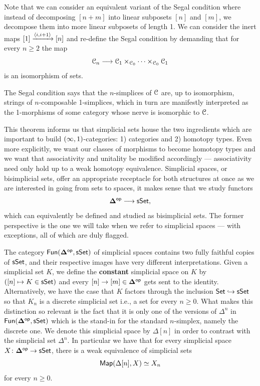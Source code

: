 \begin{remark}
 Note that we can consider an equivalent variant of the Segal condition where instead of decomposing $[n+m]$ into linear subposets $[n]$ and $[m]$, we decompose them into more linear subposets of length 1. We can consider the inert maps $[1] \xrightarrow{\langle i, i+1\rangle} [n]$ and re-define the Segal condition by demanding that for every $n\geq 2$ the map
 \begin{equation}
    \mathcal C_{n} \longrightarrow \mathcal C_{1} \times_{\mathcal C_{0}} \cdots \times_{\mathcal C_{0}} \mathcal C_{1}
 \end{equation}
 is an isomorphism of sets.
\end{remark}

\begin{observation}
The Segal condition says that the $n$-simplices of $\mathcal C$ are, up to isomorphism, strings of $n$-composable 1-simplices, which in turn are manifestly interpreted as the 1-morphisms of some category whose nerve is isomorphic to $\mathcal C$.
\end{observation}

This theorem informs us that simplicial sets house the two ingredients which are important to build $(\operatorname{\infty},1)$-categories: 1) categories and 2) homotopy types. Even more explicitly, we want our classes of morphisms to become homotopy types and we want that associativity and unitality be modified accordingly — associativity need only hold up to a weak homotopy equivalence. Simplicial spaces, or bisimplicial sets, offer an appropriate receptacle for both structures at once as we are interested in going from sets to spaces, it makes sense that we study functors
\begin{equation}
    \mathbf\Delta^{\mathsf{op}} \longrightarrow \operatorname{\sf sSet},
\end{equation}
which can equivalently be defined and studied as bisimplicial sets. The former perspective is the one we will take when we refer to simplicial spaces — with exceptions, all of which are duly flagged.

\begin{remark}
    The category $\operatorname{\sf Fun}(\mathbf\Delta^{\mathsf{op}},\operatorname{\sf sSet})$ of simplicial spaces contains two fully faithful copies of $\operatorname{\sf sSet}$, and their respective images have very different interpretations. Given a simplicial set $K$, we define the \textbf{constant} simplicial space on $K$ by $([n] \mapsto K\in \operatorname{\sf sSet})$ and every $[n] \rightarrow [m]\in \mathbf\Delta^{\mathsf{op}}$ gets sent to the identity. Alternatively, we have the case that $K$ factors through the inclusion $\mathsf{Set} \hookrightarrow \operatorname{\sf sSet}$ so that $K_n$ is a discrete simplicial set i.e., a set for every $n\geq 0$. What makes this distinction so relevant is the fact that it is only one of the versions of $\Delta^{n}$ in $\operatorname{\sf Fun}(\mathbf\Delta^{\mathsf{op}},\operatorname{\sf sSet})$ which is the stand-in for the standard $n$-simplex, namely the discrete one. We denote this simplicial space by $\Delta[n]$ in order to contrast with the simplicial set $\Delta^n$. In particular we have that for every simplicial space $X\colon \mathbf\Delta^{\mathsf{op}} \rightarrow \operatorname{\sf sSet}$, there is a weak equivalence of simplicial sets
    \begin{equation}
        \operatorname{{\sf Map}}(\Delta[n], X) \simeq X_n 
    \end{equation}
    for every $n\geq 0$.
\end{remark}

